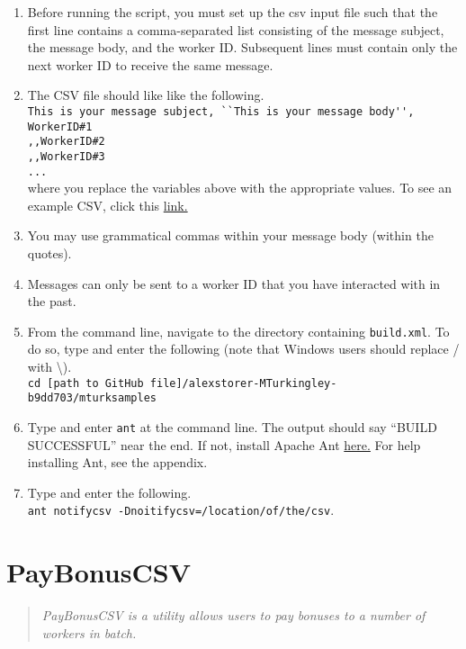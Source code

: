 \documentclass[10pt]{article}
\begin{document}
\begin{enumerate}
	\item Before running the script, you must set up the csv input file such that the first line contains a comma-separated list consisting of the message subject, the message body, and the worker ID. Subsequent lines must contain only the next worker ID to receive the same message. 
	\item The CSV file should like like the following.\\
	\verb+This is your message subject, ``This is your message body'', WorkerID#1+\\
	\verb+,,WorkerID#2+\\
	\verb+,,WorkerID#3+\\
	\verb+...+\\
	where you replace the variables above with the appropriate values. To see an example CSV, click this \href{https://dl.dropbox.com/u/9693706/notify.csv}{link.}
	\item You may use grammatical commas within your message body (within the quotes). 
	\item Messages can only be sent to a worker ID that you have interacted with in the past.
	\item From the command line, navigate to the directory containing \verb+build.xml+. To do so, type and enter the following (note that Windows users should replace / with \textbackslash).\\
	\verb+cd [path to GitHub file]/alexstorer-MTurkingley-b9dd703/mturksamples+
	\item Type and enter \verb+ant+ at the command line. The output should say ``BUILD SUCCESSFUL'' near the end. If not, install Apache Ant \href{http://ant.apache.org/}{here.} For help installing Ant, see the appendix.
	\item Type and enter the following.\\ \verb+ant notifycsv -Dnoitifycsv=/location/of/the/csv+.
\end{enumerate}

\section*{PayBonusCSV}

\begin{quotation}
\noindent \emph{PayBonusCSV is a utility allows users to pay bonuses to a number of workers in batch.}
\end{quotation}
\end{document}
